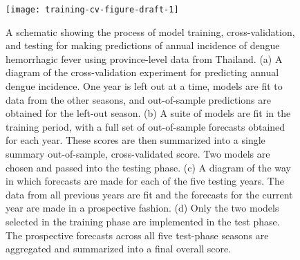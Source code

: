 \documentclass[a4paper]{article}
\begin{document}
\begin{figure}[htbp]
\begin{center}
\texttt{[image: training-cv-figure-draft-1]}
\caption{A schematic showing the process of model training, cross-validation, and testing for making predictions of annual incidence of dengue hemorrhagic fever using province-level data from Thailand. 
(a) A diagram of the cross-validation experiment for predicting annual dengue incidence. One year is left out at a time, models are fit to data from the other seasons, and out-of-sample predictions are obtained for the left-out season. 
(b) A suite of models are fit in the training period, with a full set of out-of-sample forecasts obtained for each year. These scores are then summarized into a single summary out-of-sample, cross-validated score. Two models are chosen and passed into the testing phase.
(c) A diagram of the way in which forecasts are made for each of the five testing years. The data from all previous years are fit and the forecasts for the current year are made in a prospective fashion.
(d) Only the two models selected in the training phase are implemented in the test phase. The prospective forecasts across all five test-phase seasons are aggregated and summarized into a final overall score.
}
\label{fig:cv-schema}
\end{center}
\end{figure}


\end{document}
